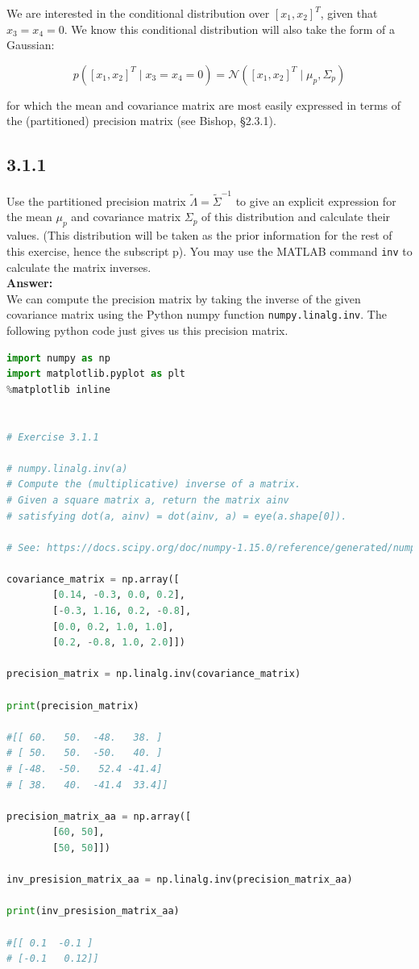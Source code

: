 \documentclass[a4paper]{article}
\begin{document}
We are interested in the conditional distribution over $[x_1,x_2]^T$, given that $x_3 = x_4 = 0$. We know this conditional distribution will also take the form of a Gaussian:

\begin{equation}
p([x_1,x_2]^T \; | \; x_3 = x_4 = 0) = \mathcal{N}([x_1,x_2]^T \; | \; \mu_p, \Sigma_p) \label{eq:part1}
\end{equation}

for which the mean and covariance matrix are most easily expressed in terms of the (partitioned) precision matrix (see Bishop, §2.3.1).



\subsection*{3.1.1}

Use the partitioned precision matrix $\tilde{\Lambda} = \tilde{\Sigma}^{-1}$ to give an explicit expression for the mean $\mu_p$ and covariance matrix $\Sigma_p$ of this distribution and calculate their values. (This distribution will be taken as the prior information for the rest of this exercise, hence the subscript p). You may use the MATLAB command \texttt{inv} to calculate the matrix inverses.\\

\textbf{Answer:}\\

We can compute the precision matrix by taking the inverse of the given covariance matrix using the Python numpy function \texttt{numpy.linalg.inv}. The following python code just gives us this precision matrix.


\begin{lstlisting}[language=Python]
import numpy as np
import matplotlib.pyplot as plt
%matplotlib inline


# Exercise 3.1.1

# numpy.linalg.inv(a)
# Compute the (multiplicative) inverse of a matrix.
# Given a square matrix a, return the matrix ainv 
# satisfying dot(a, ainv) = dot(ainv, a) = eye(a.shape[0]).

# See: https://docs.scipy.org/doc/numpy-1.15.0/reference/generated/numpy.linalg.inv.html

covariance_matrix = np.array([
        [0.14, -0.3, 0.0, 0.2], 
        [-0.3, 1.16, 0.2, -0.8], 
        [0.0, 0.2, 1.0, 1.0], 
        [0.2, -0.8, 1.0, 2.0]])

precision_matrix = np.linalg.inv(covariance_matrix)

print(precision_matrix)

#[[ 60.   50.  -48.   38. ]
# [ 50.   50.  -50.   40. ]
# [-48.  -50.   52.4 -41.4]
# [ 38.   40.  -41.4  33.4]]

precision_matrix_aa = np.array([
        [60, 50], 
        [50, 50]])

inv_presision_matrix_aa = np.linalg.inv(precision_matrix_aa)

print(inv_presision_matrix_aa)

#[[ 0.1  -0.1 ]
# [-0.1   0.12]]
\end{lstlisting}
\end{document}
